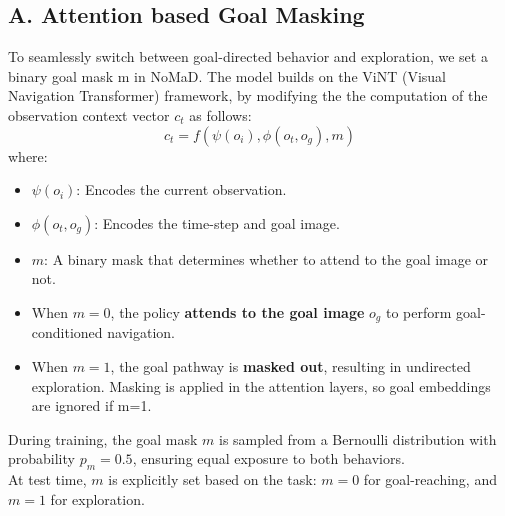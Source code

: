 \documentclass[12pt]{article}
\begin{document}
\begin{appendices}
\subsection*{A. Attention based Goal Masking}
\label{subsec:goal_masking}
To seamlessly switch between goal-directed behavior and exploration, we set a binary goal mask m in NoMaD.
The model builds on the ViNT (Visual Navigation Transformer) framework, by modifying the the computation of the observation context vector $c_t$ as follows:\\
\[
c_t = f(\psi(o_i), \phi(o_t, o_g), m)
\]
where:
\begin{itemize}
    \item $\psi(o_i)$: Encodes the current observation.
    \item $\phi(o_t, o_g)$: Encodes the time-step and goal image.
    \item $m$: A binary mask that determines whether to attend to the goal image or not.
\end{itemize}
\begin{itemize}
    \item When $m = 0$, the policy \textbf{attends to the goal image} $o_g$ to perform goal-conditioned navigation.
    \item When $m = 1$, the goal pathway is \textbf{masked out}, resulting in undirected exploration. Masking is applied in the attention layers, so goal embeddings are ignored if m=1.
\end{itemize}
During training, the goal mask $m$ is sampled from a Bernoulli distribution with probability $p_m = 0.5$, ensuring equal exposure to both behaviors. \\
At test time, $m$ is explicitly set based on the task: $m = 0$ for goal-reaching, and $m = 1$ for exploration.


\end{appendices}
\end{document}
